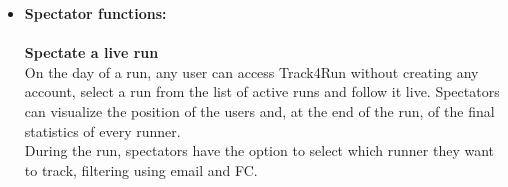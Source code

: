 \documentclass[titlepage]{article}
\begin{document}
\begin{itemize}
{\bf Organize new runs} \\
Track4Run gives organizers, using a Third Party account, the possibility to create a run and get data from participants. When creating a run, organizers have to define the path that the run will follow on a map, set the starting time and ending time of the event and the maximum number of participants. When a run is full no more runners can join it.\\
Throughout the event, organizers have access to live data of all participants, and can save that data after the event has finished.\\

	\item{\bf Spectator functions: }\\
	\\
	{\bf Spectate a live run} \\
	On the day of a run, any user can access Track4Run without creating any account, select a run from the list of active runs and follow it live. Spectators can visualize the position of the users and, at the end of the run, of the final statistics of every runner.\\
During the run, spectators have the option to select which runner they want to track, filtering using email and FC.\\
	\end{itemize}
	
\end{document}

